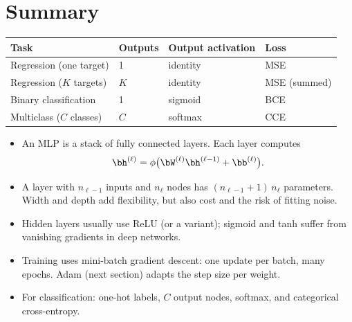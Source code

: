 \documentclass[12pt, a4paper]{article}
\begin{document}
\section{Summary}

\begin{center}
  \renewcommand{\arraystretch}{1.35}
  \begin{tabular}{llll}
    \toprule
    Task                     & Outputs & Output activation & Loss         \\
    \midrule
    Regression (one target)  & 1       & identity          & MSE          \\
    Regression ($K$ targets) & $K$     & identity          & MSE (summed) \\
    Binary classification    & 1       & sigmoid           & BCE          \\
    Multiclass ($C$ classes) & $C$     & softmax           & CCE          \\
    \bottomrule
  \end{tabular}
\end{center}

\begin{itemize}
  \item An MLP is a stack of fully connected layers. Each layer computes
        \[\bh^{(\ell)} = \phi\bigl(\bW^{(\ell)} \bh^{(\ell-1)} + \bb^{(\ell)}\bigr).\]
  \item A layer with $n_{\ell-1}$ inputs and $n_\ell$ nodes has
        $(n_{\ell-1}+1)\,n_\ell$ parameters. Width and depth add flexibility,
        but also cost and the risk of fitting noise.
  \item Hidden layers usually use ReLU (or a variant); sigmoid and tanh suffer
        from vanishing gradients in deep networks.
  \item Training uses mini-batch gradient descent: one update per batch, many
        epochs. Adam (next section) adapts the step size per weight.
  \item For classification: one-hot labels, $C$ output nodes, softmax, and
        categorical cross-entropy.
\end{itemize}
\end{document}
